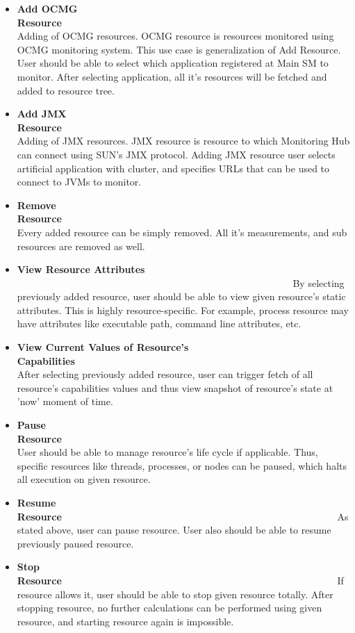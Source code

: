 \begin{itemize}
 \item {\bf Add OCMG Resource}~~~~~~~~~~~~~~~~~~~~~~~~~~~~~~~~~~~~~~~~~~~~~~~~~~~~~~~~\linebreak
Adding of OCMG resources. OCMG resource is resources monitored using OCMG monitoring system. This use case is
generalization of Add Resource. User should be able to select which application registered at Main SM to monitor. After
selecting application, all it's resources will be fetched and added to resource tree.
 \item {\bf Add JMX Resource}~~~~~~~~~~~~~~~~~~~~~~~~~~~~~~~~~~~~~~~~~~~~~~~~~~~~~~~~\linebreak
Adding of JMX resources. JMX resource is resource to which Monitoring Hub can connect using SUN's JMX protocol. Adding
JMX resource user selects artificial application with cluster, and specifies URLs that can be used to connect to JVMs
to monitor.
 \item {\bf Remove Resource}~~~~~~~~~~~~~~~~~~~~~~~~~~~~~~~~~~~~~~~~~~~~~~~~~~~~~~~~\linebreak
Every added resource can be simply removed. All it's measurements, and sub resources are removed as well.
 \item {\bf View Resource Attributes} ~~~~~~~~~~~~~~~~~~~~~~~~~~~~~~~~~~~~~~~~~~~~~~~~~~~~~~~~\linebreak
By selecting previously added resource, user should be able to view given resource's static attributes. This is highly
resource-specific. For example, process resource may have attributes like executable path, command line attributes, etc.
 \item {\bf View Current Values of Resource's
Capabilities}~~~~~~~~~~~~~~~~~~~~~~~~~~~~~~~~~~~~~~~~~~~~~~~~~~~~~~~~\linebreak
After selecting previously added resource, user can trigger fetch of all resource's capabilities values and thus view
snapshot of resource's state at 'now' moment of time.
 \item {\bf Pause Resource}~~~~~~~~~~~~~~~~~~~~~~~~~~~~~~~~~~~~~~~~~~~~~~~~~~~~~~~~\linebreak
User should be able to manage resource's life cycle if applicable. Thus, specific resources like threads, processes, or
nodes can be paused, which halts all execution on given resource.
 \item {\bf Resume Resource}~~~~~~~~~~~~~~~~~~~~~~~~~~~~~~~~~~~~~~~~~~~~~~~~~~~~~~~~\linebreak
As stated above, user can pause resource. User also should be able to resume previously paused resource.
 \item {\bf Stop Resource}~~~~~~~~~~~~~~~~~~~~~~~~~~~~~~~~~~~~~~~~~~~~~~~~~~~~~~~~\linebreak
If resource allows it, user should be able to stop given resource totally. After stopping resource, no further
calculations can be performed using given resource, and starting resource again is impossible.
\end{itemize}

